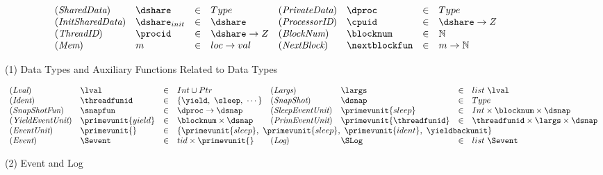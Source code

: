 \begin{figure}
\begin{small}
\[
\begin{array}{llll llll}
(\textit{SharedData}) & \dshare & \in & Type &
(\textit{PrivateData}) &  \dproc & \in & Type\\
(\textit{InitSharedData}) & \dshare_{init} & \in & \dshare &
(\textit{ProcessorID}) & \cpuid & \in & \dshare \rightarrow Z\\
(\textit{ThreadID}) & \procid & \in & \dshare \rightarrow Z&
(\textit{BlockNum}) & \blocknum & \in & \mathbb{N} \\
(\textit{Mem}) & m & \in & loc \rightarrow val &
(\textit{NextBlock}) & \nextblockfun & \in & m \rightarrow  \mathbb{N} \\
\end{array}
\]
\begin{center}
(1) Data Types and Auxiliary Functions Related to Data Types
\end{center}
\vspace{-1em}

\[
\begin{array}{llllllll}
(\textit{Lval}) & \lval & \in & Int \cup Ptr  &
(\textit{Largs}) & \largs & \in & list \ \lval  \\
(\textit{Ident}) & \threadfunid & \in & \{\yield,\ \sleep,\ \cdots\}&
(\textit{SnapShot}) & \dsnap & \in & Type  \\
(\textit{SnapShotFun}) & \snapfun & \in &  \dproc \rightarrow \dsnap &
(\textit{SleepEventUnit}) & \primevunit{sleep} & \in & Int \times \blocknum \times \dsnap \\
(\textit{YieldEventUnit}) & \primevunit{yield} & \in & \blocknum \times \dsnap &
(\textit{PrimEventUnit}) & \primevunit{\threadfunid} & \in & \threadfunid \times \largs \times \dsnap \\
(\textit{EventUnit}) &  \primevunit{} & \in &
\multicolumn{5}{l}{
 \{\primevunit{sleep},\ \primevunit{sleep},\  \primevunit{ident},\  \yieldbackunit \} 
 }
 \\
(\textit{Event}) &  \Sevent & \in & tid \times \primevunit{} &
(\textit{Log}) &  \SLog & \in & list\ \Sevent \\
\end{array}
\]
\begin{center}
(2) Event and Log
\end{center}
\vspace{-1em}


\end{small}
\end{figure}
